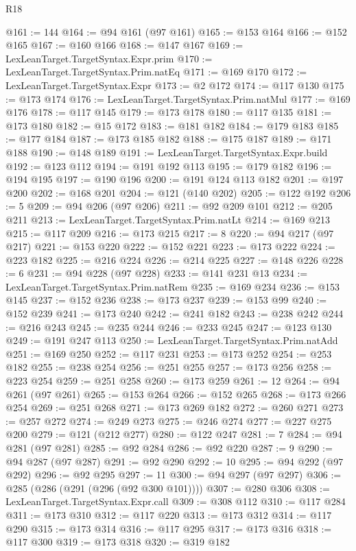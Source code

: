 \begin{lexlean}{R18}
\begin{coremodule}
@161 := 144
@164 := @94 @161 (@97 @161)
@165 := @153 @164
@166 := @152 @165
@167 := @160 @166
@168 := @147 @167
@169 := LexLeanTarget.TargetSyntax.Expr.prim
@170 := LexLeanTarget.TargetSyntax.Prim.natEq
@171 := @169 @170
@172 := LexLeanTarget.TargetSyntax.Expr
@173 := @2 @172
@174 := @117 @130
@175 := @173 @174
@176 := LexLeanTarget.TargetSyntax.Prim.natMul
@177 := @169 @176
@178 := @117 @145
@179 := @173 @178
@180 := @117 @135
@181 := @173 @180
@182 := @15 @172
@183 := @181 @182
@184 := @179 @183
@185 := @177 @184
@187 := @173 @185 @182
@188 := @175 @187
@189 := @171 @188
@190 := @148 @189
@191 := LexLeanTarget.TargetSyntax.Expr.build
@192 := @123 @112
@194 := @191 @192 @113
@195 := @179 @182
@196 := @194 @195
@197 := @190 @196
@200 := @191 @124 @113 @182
@201 := @197 @200
@202 := @168 @201
@204 := @121 (@140 @202)
@205 := @122 @192
@206 := 5
@209 := @94 @206 (@97 @206)
@211 := @92 @209 @101
@212 := @205 @211
@213 := LexLeanTarget.TargetSyntax.Prim.natLt
@214 := @169 @213
@215 := @117 @209
@216 := @173 @215
@217 := 8
@220 := @94 @217 (@97 @217)
@221 := @153 @220
@222 := @152 @221
@223 := @173 @222
@224 := @223 @182
@225 := @216 @224
@226 := @214 @225
@227 := @148 @226
@228 := 6
@231 := @94 @228 (@97 @228)
@233 := @141 @231 @13
@234 := LexLeanTarget.TargetSyntax.Prim.natRem
@235 := @169 @234
@236 := @153 @145
@237 := @152 @236
@238 := @173 @237
@239 := @153 @99
@240 := @152 @239
@241 := @173 @240
@242 := @241 @182
@243 := @238 @242
@244 := @216 @243
@245 := @235 @244
@246 := @233 @245
@247 := @123 @130
@249 := @191 @247 @113
@250 := LexLeanTarget.TargetSyntax.Prim.natAdd
@251 := @169 @250
@252 := @117 @231
@253 := @173 @252
@254 := @253 @182
@255 := @238 @254
@256 := @251 @255
@257 := @173 @256
@258 := @223 @254
@259 := @251 @258
@260 := @173 @259
@261 := 12
@264 := @94 @261 (@97 @261)
@265 := @153 @264
@266 := @152 @265
@268 := @173 @266 @254
@269 := @251 @268
@271 := @173 @269 @182
@272 := @260 @271
@273 := @257 @272
@274 := @249 @273
@275 := @246 @274
@277 := @227 @275 @200
@279 := @121 (@212 @277)
@280 := @122 @247
@281 := 7
@284 := @94 @281 (@97 @281)
@285 := @92 @284
@286 := @92 @220
@287 := 9
@290 := @94 @287 (@97 @287)
@291 := @92 @290
@292 := 10
@295 := @94 @292 (@97 @292)
@296 := @92 @295
@297 := 11
@300 := @94 @297 (@97 @297)
@306 := @285 (@286 (@291 (@296 (@92 @300 @101))))
@307 := @280 @306
@308 := LexLeanTarget.TargetSyntax.Expr.call
@309 := @308 @112
@310 := @117 @284
@311 := @173 @310
@312 := @117 @220
@313 := @173 @312
@314 := @117 @290
@315 := @173 @314
@316 := @117 @295
@317 := @173 @316
@318 := @117 @300
@319 := @173 @318
@320 := @319 @182

\end{coremodule}
\end{lexlean}
